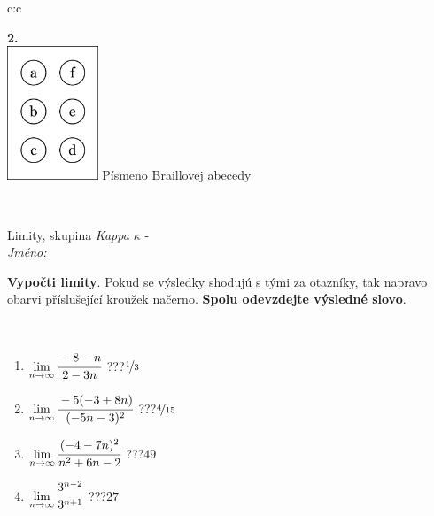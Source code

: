 \documentclass[10pt]{report}
\begin{document}
\begin{tabular}{c:c}
\begin{minipage}[c][104.5mm][t]{0.5\linewidth}
\begin{center}
\begin{minipage}{0.20\linewidth}
\begin{center}
{\Huge\bfseries 2.} \\[2mm]
\includegraphics[height=40mm]{../images/braille.png}
{\small Písmeno Braillovej abecedy}
\end{center}
\end{minipage}
\end{center}
\end{minipage}
\\ \hdashline
\begin{minipage}[c][104.5mm][t]{0.5\linewidth}
\begin{center}
\vspace{7mm}
{\huge Limity, skupina \textit{Kappa $\kappa$} -}\\[5mm]
\textit{Jméno:}\phantom{xxxxxxxxxxxxxxxxxxxxxxxxxxxxxxxxxxxxxxxxxxxxxxxxxxxxxxxxxxxxxxxxx}\\[5mm]
\begin{minipage}{0.95\linewidth}
\begin{center}
\textbf{Vypočti limity}. Pokud se výsledky shodujú s tými za otazníky, tak napravo\\obarvi příslušející kroužek načerno. \textbf{Spolu odevzdejte výsledné slovo}.
\end{center}
\end{minipage}
\\[1mm]
\begin{minipage}{0.79\linewidth}
\begin{center}
\begin{varwidth}{\linewidth}
\begin{enumerate}
\normalsize
\item $\lim\limits_{n\to\infty}\cfrac{-8-n}{2-3n}$\quad \dotfill\; ???\;\dotfill \quad $\nicefrac{1}{3}$
\item $\lim\limits_{n\to\infty}\cfrac{-5(-3+8n)}{(-5n-3)^2}$\quad \dotfill\; ???\;\dotfill \quad $\nicefrac{4}{15}$
\item $\lim\limits_{n\to\infty}\cfrac{(-4-7n)^2}{n^2+6n-2}$\quad \dotfill\; ???\;\dotfill \quad $49$
\item $\lim\limits_{n\to\infty}\cfrac{3^{n-2}}{3^{n+1}}$\quad \dotfill\; ???\;\dotfill \quad $27$

\end{enumerate}
\end{varwidth}
\end{center}
\end{minipage}
\end{center}
\end{minipage}
\end{tabular}
\end{document}

